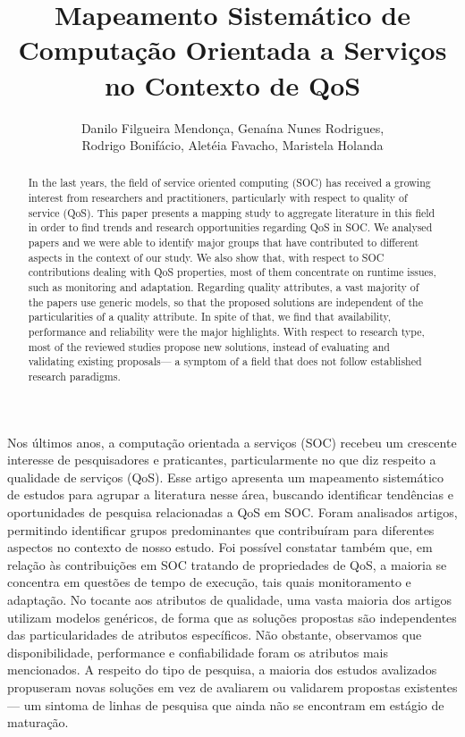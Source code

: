 \documentclass[12pt]{article}
\title{Mapeamento Sistem\'{a}tico de Computa\c{c}\~{a}o Orientada a Servi\c{c}os no Contexto de QoS}
\author{Danilo Filgueira Mendon\c{c}a\inst{1}, Gena\'{i}na Nunes Rodrigues\inst{1}, \\ Rodrigo Bonif\'{a}cio\inst{1}, Alet\'{e}ia Favacho\inst{1}, Maristela Holanda\inst{1} }
\begin{document}
 



\maketitle

\begin{abstract}

In the last years, the field of service oriented computing (SOC) has received a growing interest from researchers and practitioners, particularly with respect to quality of service (QoS). This paper presents a mapping study to aggregate literature in this field in order to find trends and research opportunities regarding QoS in SOC. We analysed \AcceptedPubs papers and we were able to identify major groups that have contributed to different aspects in the context of our study. We also show that, with respect to SOC contributions dealing with QoS properties, most of them concentrate on runtime issues, such as monitoring and adaptation. Regarding quality attributes, a vast majority of the papers use generic models, so that the proposed solutions are independent of the particularities of a quality attribute. In spite of that, we find that availability, performance and reliability were the major highlights. With respect to research type, most of the reviewed studies propose new solutions, instead of evaluating and validating existing proposals--- a symptom of a field that does not follow established research paradigms.
\end{abstract}

\begin{resumo}
Nos últimos anos, a computação orientada a serviços (SOC) recebeu um crescente interesse de pesquisadores e praticantes, particularmente no que diz respeito a qualidade de serviços (QoS). Esse artigo apresenta um mapeamento sistem\'{a}tico de estudos para agrupar a literatura nesse \'{a}rea, buscando  identificar tendências e oportunidades de pesquisa relacionadas a QoS em SOC. Foram analisados \AcceptedPubs artigos, permitindo identificar grupos predominantes que contribuíram para diferentes aspectos no contexto de nosso estudo. Foi poss\'{i}vel constatar tamb\'{e}m que, em relação às contribuições em SOC tratando de propriedades de QoS, a maioria se concentra em questões de tempo de execução, tais quais monitoramento e adaptação. No tocante aos atributos de qualidade, uma vasta maioria dos artigos utilizam modelos genéricos, de forma que as soluções propostas são independentes das particularidades de atributos 
espec\'{i}ficos. Não obstante, observamos que disponibilidade, performance e confiabilidade foram os atributos mais mencionados. A respeito do tipo de pesquisa, a maioria dos estudos avalizados propuseram novas soluções em vez de avaliarem ou validarem propostas existentes--- um sintoma 
de linhas de pesquisa que ainda n\~{a}o se encontram em est\'{a}gio de matura\c c\~{a}o.
  
\end{resumo}



    











\end{document}
